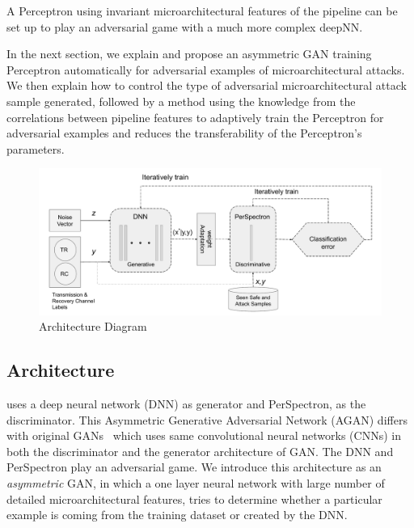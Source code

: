\begin{note}

A Perceptron using invariant microarchitectural features of the pipeline can be set up to play an adversarial game with a much more complex deepNN. 

% 
\end{note}
 
In the next section, we explain \scheme and propose an asymmetric GAN training Perceptron automatically for adversarial examples of microarchitectural attacks. We then explain how to control the type of adversarial microarchitectural attack sample generated, followed by a method using the knowledge from the correlations between pipeline features to adaptively train the Perceptron for adversarial examples and reduces the transferability of the Perceptron's parameters. 

\begin{figure}[ht!]
\centering
\includegraphics[width=\textwidth]{PerSpectron-Micro2020-camera-R/img/Brutus.pdf}

\caption{\scheme{} Architecture Diagram }

\label{fig:algdiagram}
\end{figure}

\subsection{{\scheme} Architecture}

{\scheme} uses a deep neural network (DNN) as generator and PerSpectron,  as the discriminator. This Asymmetric Generative Adversarial Network (AGAN) differs with original  GANs~\cite{goodfellow2014generative} which uses same convolutional neural
networks (CNNs) in both the discriminator and the generator
architecture of GAN.  The DNN and PerSpectron play an
adversarial game. We introduce this architecture as an {\em asymmetric} GAN, in which a one layer neural network with large number of detailed microarchitectural features, tries to determine whether a particular example is coming from the training dataset or created by the DNN. 

